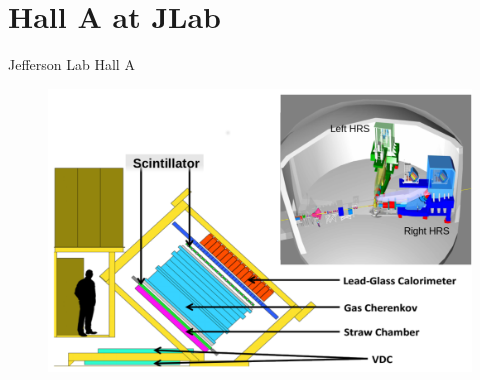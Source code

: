 \documentclass{beamer}
\begin{document}
\begin{frame}
\begin{columns}[t]
	
\end{columns}
\end{frame}
\section{Hall A at JLab}
\begin{frame}
\begin{block}{Jefferson Lab Hall A}
	\begin{figure}
		\includegraphics[width=12.0cm]{../images/HallaHRS.pdf}
	\end{figure}
	
\end{block}

\end{frame}
\end{document}

